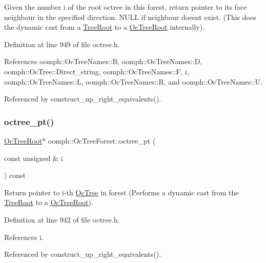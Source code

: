 Given the number i of the root octree in this forest, return pointer to its face neighbour in the specified direction. N\+U\+LL if neighbour doesn\textquotesingle{}t exist. (This does the dynamic cast from a \hyperlink{classoomph_1_1TreeRoot}{Tree\+Root} to a \hyperlink{classoomph_1_1OcTreeRoot}{Oc\+Tree\+Root} internally). 



Definition at line 949 of file octree.\+h.



References oomph\+::\+Oc\+Tree\+Names\+::B, oomph\+::\+Oc\+Tree\+Names\+::D, oomph\+::\+Oc\+Tree\+::\+Direct\+\_\+string, oomph\+::\+Oc\+Tree\+Names\+::F, i, oomph\+::\+Oc\+Tree\+Names\+::L, oomph\+::\+Oc\+Tree\+Names\+::R, and oomph\+::\+Oc\+Tree\+Names\+::U.



Referenced by construct\+\_\+up\+\_\+right\+\_\+equivalents().

\mbox{\label{classoomph_1_1OcTreeForest_aa51c75e4ffadde74c38511e21c0081e4}} 
\subsubsection{\texorpdfstring{octree\+\_\+pt()}{octree\_pt()}}
{\footnotesize\ttfamily \hyperlink{classoomph_1_1OcTreeRoot}{Oc\+Tree\+Root}$\ast$ oomph\+::\+Oc\+Tree\+Forest\+::octree\+\_\+pt (\begin{DoxyParamCaption}\item[{const unsigned \&}]{i }\end{DoxyParamCaption}) const\hspace{0.3cm}{\ttfamily [inline]}}



Return pointer to i-\/th \hyperlink{classoomph_1_1OcTree}{Oc\+Tree} in forest (Performs a dynamic cast from the \hyperlink{classoomph_1_1TreeRoot}{Tree\+Root} to a \hyperlink{classoomph_1_1OcTreeRoot}{Oc\+Tree\+Root}). 



Definition at line 942 of file octree.\+h.



References i.



Referenced by construct\+\_\+up\+\_\+right\+\_\+equivalents().

